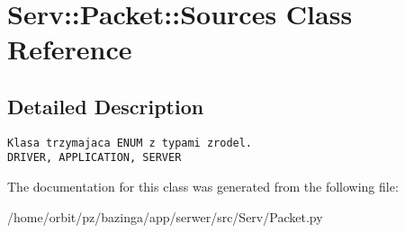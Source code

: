 \hypertarget{class_serv_1_1_packet_1_1_sources}{
\section{Serv::Packet::Sources Class Reference}
\label{class_serv_1_1_packet_1_1_sources}
}


\subsection{Detailed Description}


\footnotesize\begin{verbatim}Klasa trzymajaca ENUM z typami zrodel.
DRIVER, APPLICATION, SERVER
\end{verbatim}
\normalsize
 

The documentation for this class was generated from the following file:\begin{CompactItemize}
\item 
/home/orbit/pz/bazinga/app/serwer/src/Serv/Packet.py\end{CompactItemize}
